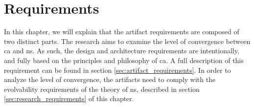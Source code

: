 \chapter{Requirements} \label{chap:requirements} 

In this chapter, we will explain that the artifact requirements are composed of two
distinct parts. The research aims to examine the level of convergence between \gls{ca} and
\gls{ns}. As such, the design and architecture requirements are intentionally, and fully
based on the principles and philosophy of \gls{ca}. A full description of this requirement
can be found in section \ref{sec:artifact_requirements}. In order to analyze the level of
convergence, the artifacts need to comply with the evolvability requirements of the theory
of \gls{ns}, described in section \ref{sec:research_requirements} of this chapter.


